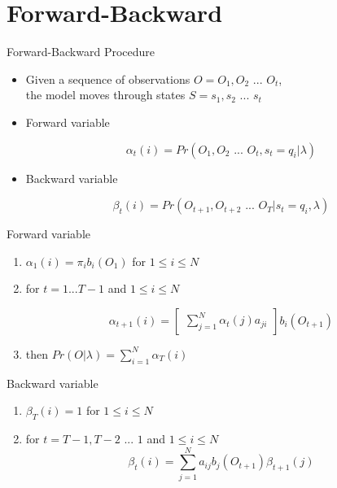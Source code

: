 \section{Forward-Backward}
\begin{frame}
Forward-Backward Procedure
\begin{itemize}
	\item Given a sequence of observations $O = O_1, O_2 \text{ ... } O_t$, \\
	      the model moves through states $S = s_1, s_2 \text{ ... } s_t$ \\ 
	\item Forward variable

		$$\alpha_t(i) = Pr(O_1, O_2 \text{ ... } O_t, s_t = q_i \vert \lambda)$$

	\item Backward variable

		$$\beta_t(i) = Pr(O_{t+1}, O_{t+2} \text{ ... } O_T \vert s_t = q_i, \lambda)$$ 
\end{itemize}
\end{frame}

\begin{frame}
Forward variable
\begin{center}
	\begin{enumerate}
		\item $\alpha_1(i) = \pi_ib_i(O_1)$ for $1 \leq i \leq N$
		\item for $t = 1 ... T-1$ and $1 \leq i \leq N$

			$$\alpha_{t+1}(i) = \begin{bmatrix} \sum_{j=1}^N\alpha_t(j)a_{ji} \end{bmatrix} b_i(O_{t+1})$$

		\item then $Pr(O | \lambda) = \sum_{i=1}^N\alpha_T(i)$
	\end{enumerate}
\end{center}
\end{frame}

\begin{frame}
Backward variable
\begin{center}
	\begin{enumerate}
		\item $\beta_T(i) = 1$ for $1 \leq i \leq N$ \\
		\item for $t = T-1, T-2 \text{ ... } 1$ and $1 \leq i \leq N$
			$$\beta_t(i) = \sum_{j=1}^N a_{ij}b_j(O_{t+1})\beta_{t+1}(j)$$

	\end{enumerate}
\end{center}
\end{frame}

















